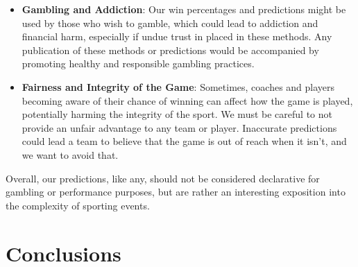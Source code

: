 \documentclass[11pt]{article}
\begin{document}
\begin{itemize}[label=\textbullet]
\item \textbf{Gambling and Addiction}:
Our win percentages and predictions might be used by those who wish to gamble, which could lead to addiction and financial harm, especially if undue trust in placed in these methods. Any publication of these methods or predictions would be accompanied by promoting healthy and responsible gambling practices.
    
\item \textbf{Fairness and Integrity of the Game}:
Sometimes, coaches and players becoming aware of their chance of winning can affect how the game is played, potentially harming the integrity of the sport. We must be careful to not provide an unfair advantage to any team or player.
Inaccurate predictions could lead a team to believe that the game is out of reach when it isn't, and we want to avoid that.
            
\end{itemize}

Overall, our predictions, like any, should not be considered declarative for gambling or performance purposes, but are rather an interesting exposition into the complexity of sporting events.


\section{Conclusions}


\end{document}
